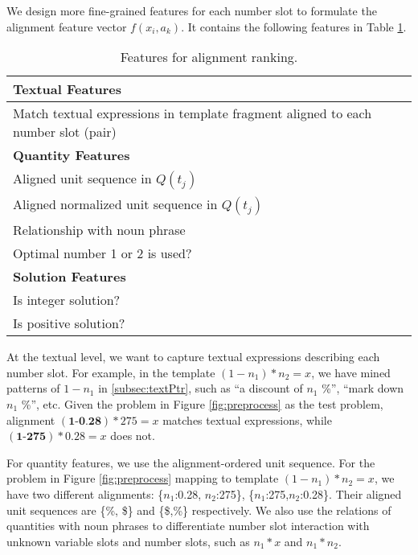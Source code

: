 \documentclass[11pt,letterpaper]{article}
\begin{document}
We design more fine-grained features for each number slot to formulate the alignment feature vector $f(x_{i},a_{k})$. It contains the following features in Table \ref{tbl:alginftr}.

\begin{table}[htb]
\begin{center}
	\begin{tabular}{|p{}|}
        \hline
		\textbf{Textual Features}\\
        \hline
        Match textual expressions in template fragment aligned to each number slot (pair)\\
        \hline
        \hline
        \textbf{Quantity Features}\\
        \hline
        Aligned unit sequence in $Q(t_{j})$\\
        Aligned normalized unit sequence in $Q(t_{j})$\\
        Relationship with noun phrase\\
        Optimal number 1 or 2 is used?\\
        \hline
        \hline
        \textbf{Solution Features}\\
        \hline
        Is integer solution?\\
        Is positive solution?\\
        \hline
    \end{tabular}
\end{center}
\caption {Features for alignment ranking.}\label{tbl:alginftr}
\end{table}

At the textual level, we want to capture textual expressions describing each number slot. For example, in the template $(1-n_1)*n_2=x$, we have mined patterns of $1-n_1$ in \ref{subsec:textPtr}, such as ``a discount of $n_1$ \%'', ``mark down $n_1$ \%'', etc. Given the problem in Figure \ref{fig:preprocess} as the test problem, alignment $(\textbf{1-0.28})*275=x$  matches textual expressions, while $(\textbf{1-275})*0.28=x$ does not.

For quantity features, we use the alignment-ordered unit sequence. For the problem in Figure \ref{fig:preprocess} mapping to template $(1-n_1)*n_2=x$, we have two different alignments: \{$n_1$:0.28, $n_2$:275\}, \{$n_1$:275,$n_2$:0.28\}. Their aligned unit sequences are \{\%, \$\} and \{\$,\%\} respectively. We also use the relations of quantities with noun phrases to differentiate number slot interaction with unknown variable slots and number slots, such as $n_1*x$ and $n_1*n_2$.
\end{document}
